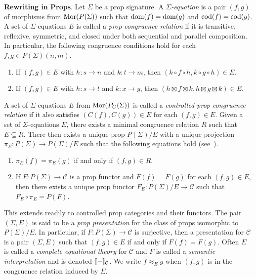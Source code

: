 \vspace{1em}
\noindent
\textbf{Rewriting in Props}.
%
Let $\Sigma$ be a prop signature.
A \emph{$\Sigma$-equation} is a pair $( f, g )$ of morphisms from $\operatorname{Mor}( P( \Sigma ) )$ such that $\operatorname{dom}( f ) = \operatorname{dom}( g )$ and $\operatorname{cod}( f ) = \operatorname{cod}( g )$.
A set of $\Sigma$-equations $E$ is called a \emph{prop congruence relation} if it is transitive, reflexive, symmetric, and closed under both sequential and parallel composition.
In particular, the following congruence conditions hold for each $f, g \in P( \Sigma )( n, m )$.
\begin{enumerate}
\item If $( f, g ) \in E$ with $h: s \to n$ and $k: t \to m$, then $( k \circ f \circ h, k \circ g \circ h ) \in E$.
\item If $( f, g ) \in E$ with $h: s \to t$ and $k: x \to y$, then $( h \boxtimes f \boxtimes k, h \boxtimes g \boxtimes k ) \in E$.
\end{enumerate}
A set of $\Sigma$-equations $E$ from $\operatorname{Mor}( P_C( \Sigma ) )$ is called a \emph{controlled prop congruence relation} if it also satisfies $( C( f ), C( g ) ) \in E$ for each $( f, g ) \in E$.
Given a set of $\Sigma$-equations $E$, there exists a minimal congruence relation $R$ such that $E \subseteq R$.
There then exists a unique prop $P( \Sigma ) / E$ with a unique projection $\pi_E: P( \Sigma ) \to P( \Sigma ) / E$ such that the following equations hold (see~\cite{Clerc2015}).
\begin{enumerate}
\item $\pi_E( f ) = \pi_E( g )$ if and only if $( f, g ) \in R$.
\item If $F: P( \Sigma ) \to \mathcal{C}$ is a prop functor and $F( f ) = F( g )$ for each $( f, g ) \in E$, then there exists a unique prop functor $F_E: P( \Sigma ) / E \to \mathcal{C}$ such that $F_E \circ \pi_E = P( F )$.
\end{enumerate}
This extends readily to controlled prop categories and their functors.
The pair $( \Sigma, E )$ is said to be a \emph{prop presentation} for the class of props isomorphic to $P( \Sigma ) / E$.
In particular, if $F: P( \Sigma ) \to \mathcal{C}$ is surjective, then a presentation for $\mathcal{C}$ is a pair $( \Sigma, E )$ such that $( f, g ) \in E$ if and only if $F( f ) = F( g )$.
Often $E$ is called a \emph{complete equational theory} for $\mathcal{C}$ and $F$ is called a \emph{semantic interpretation} and is denoted $\llbracket-\rrbracket_\mathcal{C}$.
We write $f \approx_E g$ when $( f, g )$ is in the congruence relation induced by $E$.

